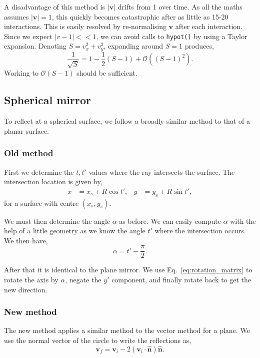 \documentclass{article}
\let\vec \bm
\begin{document}
A disadvantage of this method is $|\vec{v}|$ drifts from 1 over time. As all the maths assumes $|\vec{v}|=1$, this quickly becomes catastrophic after as little as 15-20 interactions. This is easily resolved by re-normalising $\vec{v}$ after each interaction. Since we expect $|v-1| << 1$, we can avoid calls to \texttt{hypot()} by using a Taylor expansion. Denoting $S=v_x^2 + v_y^2$, expanding around $S=1$ produces,
\begin{equation}
    \frac{1}{\sqrt S}
    =
    1
    -\frac{1}{2}(S-1)
    +
    \mathcal{O} \left(
    (S-1)^2
    \right).
\end{equation}
Working to $\mathcal{O} \left(S-1\right)$ should be sufficient.

\subsection{Spherical mirror}
To reflect at a spherical surface, we follow a broadly similar method to that of a planar surface. 

\subsubsection{Old method}
First we determine the $t, t'$ values where the ray intersects the surface. The intersection location is given by,
\begin{align}
    x
    &=
    x_s + R \cos t',
    &
    y
    &=
    y_s + R \sin t',
\end{align}
for a surface with centre $(x_s, y_s)$.

We must then determine the angle $\alpha$ as before. We can easily compute $\alpha$ with the help of a little geometry as we know the angle $t'$ where the intersection occurs. We then have,
\begin{equation}
    \label{eq:alpha_sph}
    \alpha = t' - \frac{\pi}{2}.
\end{equation}

After that it is identical to the plane mirror. We use Eq.~\ref{eq:rotation_matrix} to rotate the axis by $\alpha$, negate the $y'$ component, and finally rotate back to get the new direction.

\subsubsection{New method}
The new method applies a similar method to the vector method for a plane. We use the normal vector of the circle to write the reflections as,
\begin{equation}
    \vec{v}_f 
    =
    \vec{v}_i - 2 (\vec{v}_i \cdot \vec{\hat{n}}) \vec{\hat{n}}.
\end{equation}
\end{document}
